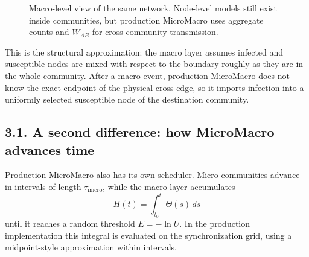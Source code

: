 \documentclass[11pt,a4paper]{article}
\begin{document}
\begin{figure}[h!]
\centering
{}
\caption{Macro-level view of the same network. Node-level models still exist inside communities, but production MicroMacro uses aggregate counts and $W_{AB}$ for cross-community transmission.}
\end{figure}

This is the structural approximation: the macro layer assumes infected and susceptible nodes are mixed with respect to the boundary roughly as they are in the whole community. After a macro event, production MicroMacro does not know the exact endpoint of the physical cross-edge, so it imports infection into a uniformly selected susceptible node of the destination community.

\subsection*{3.1. A second difference: how MicroMacro advances time}
Production MicroMacro also has its own scheduler. Micro communities advance in intervals of length $\tau_{\mathrm{micro}}$, while the macro layer accumulates
\[
H(t)=\int_{t_0}^{t}\Theta(s)\,ds
\]
until it reaches a random threshold $E=-\ln U$. In the production implementation this integral is evaluated on the synchronization grid, using a midpoint-style approximation within intervals.
\end{document}
